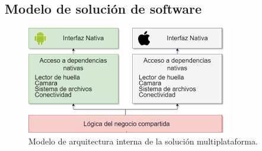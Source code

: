 \documentclass[10pt]{article}
\begin{document}
\subsection{Modelo de  solución de software}
\begin{figure}[H]
    \begin{center}
        \includegraphics[width=0.8\textwidth]{Imagenes/12.PNG}
        \caption{Modelo de arquitectura interna de la solución multiplataforma.}
        \label{fig11}
    \end{center}
\end{figure}
\end{document}
